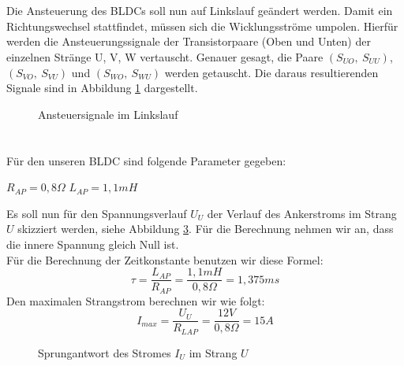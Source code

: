 \section{}\label{sec:2c}
Die Ansteuerung des BLDCs soll nun auf Linkslauf geändert werden. Damit ein Richtungswechsel stattfindet, müssen sich die Wicklungsströme umpolen. Hierfür werden die Ansteuerungssignale der Transistorpaare (Oben und Unten) der einzelnen Stränge U, V, W vertauscht. Genauer gesagt, die Paare $ (S_{UO},~S_{UU}) $, $ (S_{VO},~S_{VU}) $ und $ (S_{WO},~S_{WU}) $ werden getauscht. Die daraus resultierenden Signale sind in Abbildung \ref{fig:2b:links} dargestellt.
\begin{figure}[h]
	\centering
	
	\caption{Ansteuersignale im Linkslauf}
	\label{fig:2b:links}
\end{figure}

\section{}\label{sec:2d}
Für den unseren BLDC sind folgende Parameter gegeben:
\begin{center}
	 $ R_{AP} = 0,8\Omega $ \hspace{2cm} $ L_{AP} = 1,1mH$\\
\end{center}
Es soll nun für den Spannungsverlauf $ U_{U} $ der Verlauf des Ankerstroms im Strang $ U $ skizziert werden, siehe Abbildung \ref{fig:2d:strom}. Für die Berechnung nehmen wir an, dass die innere Spannung gleich Null ist.\\
Für die Berechnung der Zeitkonstante benutzen wir diese Formel:\\
\begin{equation}
	\tau = \frac{L_{AP}}{R_{AP}} = \frac{1,1mH}{0,8\Omega} = 1,375ms
\end{equation}
Den maximalen Strangstrom berechnen wir wie folgt:
\begin{equation}
	I_{max} = \frac{U_{U}}{R_{LAP}} = \frac{12V}{0,8\Omega} = 15A
\end{equation}
\begin{figure}[t]
	\centering
	\begin{subfigure}[Spannung im Strang $ U $]
		{}
	\end{subfigure}
	\begin{subfigure}[Stromverlauf im Strang $ U $]
		{}
		\label{fig:2d:strom}
	\end{subfigure}
	\caption{Sprungantwort des Stromes $ I_{U} $ im Strang $ U $}
\end{figure}



\clearpage
